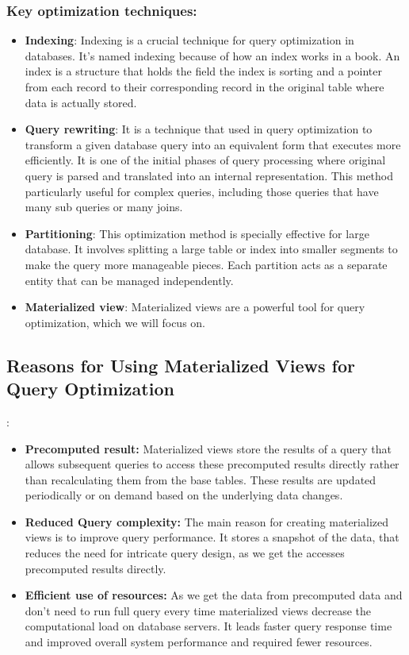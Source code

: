 \subsubsection{Key optimization techniques:}
 \begin{itemize}
     \item \textbf{Indexing}: Indexing is a crucial technique for query optimization in databases. It's named indexing because of how an index works in a book. An index is a structure that holds the field the index is sorting and a pointer from each record to their corresponding record in the original table where data is actually stored.\cite{tomar-2021,atlassian-no-date}
     \item \textbf{Query rewriting}: It is a technique that used in query optimization to transform a given database query into an equivalent form that executes more efficiently. It is one of the initial phases of query processing where original query is parsed and translated into an internal representation. This method particularly useful for complex queries, including those queries that have many sub queries or many joins.\cite{pitoura-2009,unknown-IBM-25-2024}
     \item \textbf{Partitioning}: This optimization method is specially  effective for large database. It involves splitting a large table or index into smaller segments to make the query more manageable pieces. Each partition acts as a separate entity that can be managed independently.\cite{planck-2024} 
     \item \textbf{Materialized view}: Materialized views are a powerful tool for query optimization, which we will focus on. 
 \end{itemize}
 
 \subsection{Reasons for Using Materialized Views for Query Optimization}:
\begin{itemize}
    \item\textbf{Precomputed result:} Materialized views store the results of a query that allows subsequent queries to access these precomputed results directly rather than recalculating them from the base tables. These results are updated periodically or on demand based on the underlying data changes.\cite{khan-2023,Risingwave-no-date}
    \item\textbf{Reduced Query complexity:} The main reason for creating materialized views is to improve query performance. It stores a snapshot of the data, that reduces the need for intricate query design, as we get the accesses precomputed results directly.\cite{Risingwave-no-date,Databricks-no-date}
    \item\textbf{Efficient use of resources:} As we  get the data from precomputed data and don't need to run full query every time materialized views decrease the computational load on database servers. It leads faster query response time and improved overall system performance and required fewer resources.\cite{google-no-date, khan-2023}
    
\end{itemize}\vspace{.4cm}

